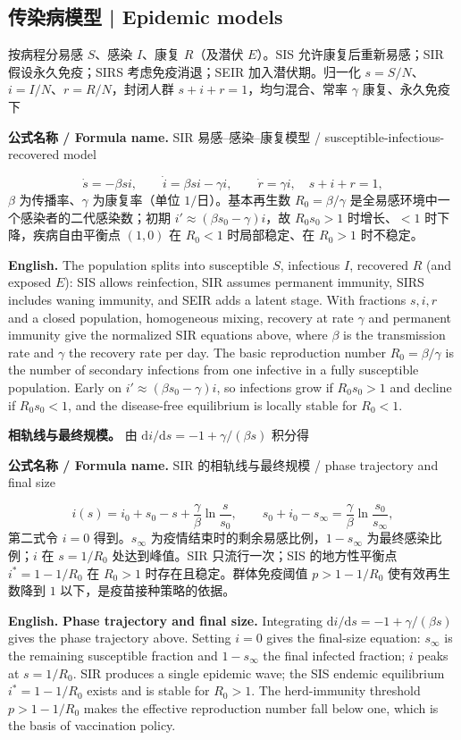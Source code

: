 \documentclass[UTF8,11pt,a4paper]{ctexart}
\newcommand{\EN}[1]{\par\noindent\textbf{English.} #1\par}
\newcommand{\FORMULA}[2]{\par\noindent\textbf{公式名称 / Formula name.} #1 / #2\par}
\begin{document}
\subsection{传染病模型 | Epidemic models}
按病程分易感 $S$、感染 $I$、康复 $R$（及潜伏 $E$）。SIS 允许康复后重新易感；SIR 假设永久免疫；SIRS 考虑免疫消退；SEIR 加入潜伏期。归一化 $s=S/N$、$i=I/N$、$r=R/N$，封闭人群 $s+i+r=1$，均匀混合、常率 $\gamma$ 康复、永久免疫下
\FORMULA{SIR 易感--感染--康复模型}{susceptible-infectious-recovered model}
\[
\dot s=-\beta si,\qquad \dot i=\beta si-\gamma i,\qquad \dot r=\gamma i,
\quad s+i+r=1,
\]
$\beta$ 为传播率、$\gamma$ 为康复率（单位 $1/$日）。基本再生数 $R_0=\beta/\gamma$ 是全易感环境中一个感染者的二代感染数；初期 $i'\approx(\beta s_0-\gamma)i$，故 $R_0s_0>1$ 时增长、$<1$ 时下降，疾病自由平衡点 $(1,0)$ 在 $R_0<1$ 时局部稳定、在 $R_0>1$ 时不稳定。
\EN{The population splits into susceptible $S$, infectious $I$, recovered $R$ (and exposed $E$): SIS allows reinfection, SIR assumes permanent immunity, SIRS includes waning immunity, and SEIR adds a latent stage. With fractions $s,i,r$ and a closed population, homogeneous mixing, recovery at rate $\gamma$ and permanent immunity give the normalized SIR equations above, where $\beta$ is the transmission rate and $\gamma$ the recovery rate per day. The basic reproduction number $R_0=\beta/\gamma$ is the number of secondary infections from one infective in a fully susceptible population. Early on $i'\approx(\beta s_0-\gamma)i$, so infections grow if $R_0s_0>1$ and decline if $R_0s_0<1$, and the disease-free equilibrium is locally stable for $R_0<1$.}
\noindent\textbf{相轨线与最终规模。} 由 $\mathrm di/\mathrm ds=-1+\gamma/(\beta s)$ 积分得
\FORMULA{SIR 的相轨线与最终规模}{phase trajectory and final size}
\[
i(s)=i_0+s_0-s+\frac{\gamma}{\beta}\ln\frac{s}{s_0},
\qquad
s_0+i_0-s_\infty=\frac{\gamma}{\beta}\ln\frac{s_0}{s_\infty},
\]
第二式令 $i=0$ 得到。$s_\infty$ 为疫情结束时的剩余易感比例，$1-s_\infty$ 为最终感染比例；$i$ 在 $s=1/R_0$ 处达到峰值。SIR 只流行一次；SIS 的地方性平衡点 $i^*=1-1/R_0$ 在 $R_0>1$ 时存在且稳定。群体免疫阈值 $p>1-1/R_0$ 使有效再生数降到 $1$ 以下，是疫苗接种策略的依据。
\EN{\textbf{Phase trajectory and final size.} Integrating $\mathrm di/\mathrm ds=-1+\gamma/(\beta s)$ gives the phase trajectory above. Setting $i=0$ gives the final-size equation: $s_\infty$ is the remaining susceptible fraction and $1-s_\infty$ the final infected fraction; $i$ peaks at $s=1/R_0$. SIR produces a single epidemic wave; the SIS endemic equilibrium $i^*=1-1/R_0$ exists and is stable for $R_0>1$. The herd-immunity threshold $p>1-1/R_0$ makes the effective reproduction number fall below one, which is the basis of vaccination policy.}
\end{document}
